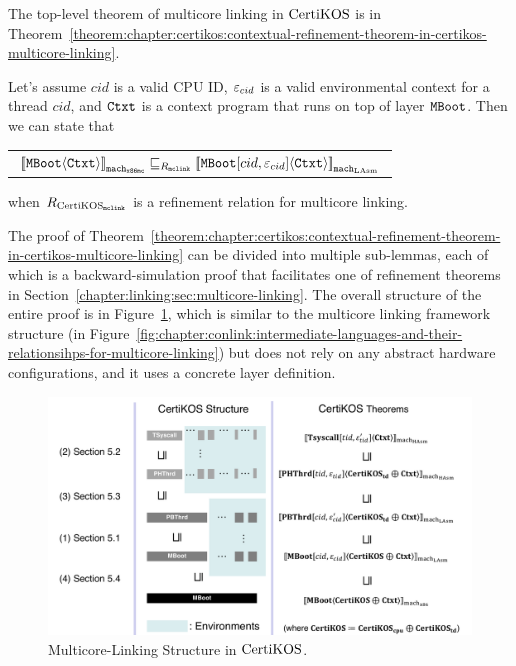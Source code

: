 The top-level theorem of
multicore linking in $\mathrm{CertiKOS}$  is in Theorem~\ref{theorem:chapter:certikos:contextual-refinement-theorem-in-certikos-multicore-linking}.
\begin{theorem}
\label{theorem:chapter:certikos:contextual-refinement-theorem-in-certikos-multicore-linking}
Let's assume  $cid$ is a valid CPU ID, ${\varepsilon}_{cid}$ is a valid
environmental context for a thread $cid$, and ${\mathrm{\texttt{Ctxt}}}$ is a
 context program that runs on top of layer ${\mathrm{\texttt{MBoot}}}$. 
 Then we can state that
 \begin{center}
\begin{tabular}{c}
${[\![{{\mathrm{\texttt{MBoot}}}} \langle {{\mathrm{\texttt{Ctxt}}}} \rangle]\!]}_{{\mathrm{\texttt{mach}}}_{{\mathrm{\texttt{x86mc}}}}} \sqsubseteq_{R_{{\mathrm{\texttt{mclink}}}}} {[\![{{\mathrm{\texttt{MBoot}}}[cid, {\varepsilon}_{cid}]} \langle {{\mathrm{\texttt{Ctxt}}}} \rangle]\!]}_{{{\mathrm{\texttt{mach}}}_{\mathrm{LAsm}}}}$\\
\end{tabular}
\end{center}
when ${R_{\mathrm{CertiKOS}_{\mathrm{\texttt{mclink}}}}}$ is a refinement relation for multicore linking.
\end{theorem}


The proof of Theorem~\ref{theorem:chapter:certikos:contextual-refinement-theorem-in-certikos-multicore-linking} 
can be divided into multiple sub-lemmas, each of which is a backward-simulation proof 
that facilitates one of refinement theorems in Section~\ref{chapter:linking:sec:multicore-linking}. 
The overall structure of the entire proof is in Figure~\ref{fig:chapter:certikos:multicore-connect-proof-overall-structure}, which is 
similar to the multicore linking framework structure (in Figure~\ref{fig:chapter:conlink:intermediate-languages-and-their-relationsihps-for-multicore-linking}) but does not rely on
any abstract hardware configurations, and it uses a concrete layer definition. 
 
\begin{figure}
\includegraphics[width=\textwidth, page=2]{figs/certikos/concurrent_linking}
\caption{Multicore-Linking Structure in $\mathrm{CertiKOS}$.}
\label{fig:chapter:certikos:multicore-connect-proof-overall-structure}
\end{figure}


